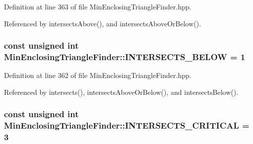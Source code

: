 \-Definition at line 363 of file \-Min\-Enclosing\-Triangle\-Finder.\-hpp.



\-Referenced by intersects\-Above(), and intersects\-Above\-Or\-Below().

\hypertarget{classmultiscale_1_1MinEnclosingTriangleFinder_ab3251c940d6ca18e9339d1d168390ab6}{
\subsubsection[{\-I\-N\-T\-E\-R\-S\-E\-C\-T\-S\-\_\-\-B\-E\-L\-O\-W}]{\setlength{\rightskip}{0pt plus 5cm}const unsigned int {\bf \-Min\-Enclosing\-Triangle\-Finder\-::\-I\-N\-T\-E\-R\-S\-E\-C\-T\-S\-\_\-\-B\-E\-L\-O\-W} = 1}}\label{classmultiscale_1_1MinEnclosingTriangleFinder_ab3251c940d6ca18e9339d1d168390ab6}


\-Definition at line 362 of file \-Min\-Enclosing\-Triangle\-Finder.\-hpp.



\-Referenced by intersects(), intersects\-Above\-Or\-Below(), and intersects\-Below().

\hypertarget{classmultiscale_1_1MinEnclosingTriangleFinder_a55ae42aad114fcd3d1b17ae181e3cdfb}{
\subsubsection[{\-I\-N\-T\-E\-R\-S\-E\-C\-T\-S\-\_\-\-C\-R\-I\-T\-I\-C\-A\-L}]{\setlength{\rightskip}{0pt plus 5cm}const unsigned int {\bf \-Min\-Enclosing\-Triangle\-Finder\-::\-I\-N\-T\-E\-R\-S\-E\-C\-T\-S\-\_\-\-C\-R\-I\-T\-I\-C\-A\-L} = 3}}\label{classmultiscale_1_1MinEnclosingTriangleFinder_a55ae42aad114fcd3d1b17ae181e3cdfb}


